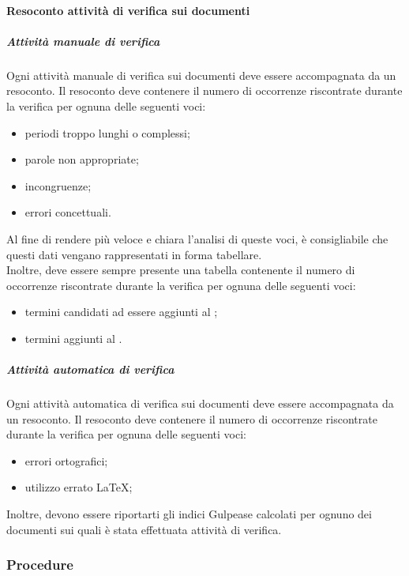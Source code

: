 \documentclass[../NormeProgetto.tex]{subfiles}
\begin{document}
		\paragraph{Resoconto attività di verifica sui documenti}
			\subparagraph{Attività manuale di verifica}		
		Ogni attività manuale di verifica sui documenti deve essere accompagnata da un resoconto. Il resoconto deve contenere il numero di occorrenze riscontrate durante la verifica per ognuna delle seguenti voci:
		\begin{itemize}
			\item periodi troppo lunghi o complessi;
			\item parole non appropriate;
			\item incongruenze;
			\item errori concettuali.		
		\end{itemize}
		Al fine di rendere più veloce e chiara l'analisi di queste voci, è consigliabile che questi dati vengano rappresentati in forma tabellare.\\
		Inoltre, deve essere sempre presente una tabella contenente il numero di occorrenze riscontrate durante la verifica per ognuna delle seguenti voci:
			\begin{itemize}
				\item termini candidati ad essere aggiunti al \glossario;
				\item termini aggiunti al \glossario.
			\end{itemize}
			\subparagraph{Attività automatica di verifica}
			Ogni attività automatica di verifica sui documenti deve essere accompagnata da un resoconto. Il resoconto deve contenere il numero di occorrenze riscontrate durante la verifica per ognuna delle seguenti voci:
			\begin{itemize}
			\item errori ortografici;
			\item utilizzo errato \LaTeX;	
			\end{itemize}
		
		Inoltre, devono essere riportarti gli indici Gulpease calcolati per ognuno dei documenti sui quali è stata effettuata attività di verifica.
			
	\subsubsection{Procedure}	
\end{document}
